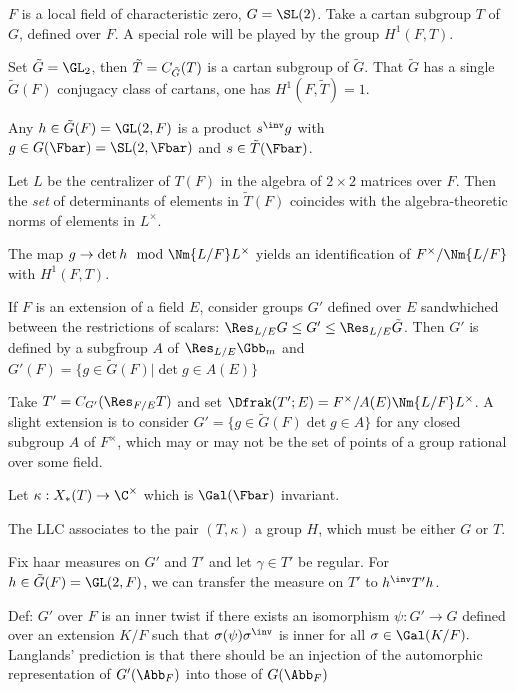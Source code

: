 



$F$ is a local field of characteristic zero, $G=\SL(2)$. Take a cartan subgroup $T$ of $G$, defined over $F$.  A special role will be played by the group $H^1(F,T)$. 

Set $\tilde{G}=\GL_2$, then $\Tilde{T} = C_{\tilde{G}} (T)$ is a cartan subgroup of $\tilde{G}$. That $\tilde{G}$ has a single $\tilde{G}(F)$ conjugacy class of cartans, one has $H^1(F,\tilde{T}) = 1.$  

Any $h\in \tilde{G}(F)=\GL(2,F)$ is a product $s^\inv g$ with $g\in G(\Fbar)=\SL(2,\Fbar)$ and $s \in \tilde{T}(\Fbar)$.

Let $L$ be the centralizer of $T(F)$ in the algebra of $2\times 2$ matrices over $F$. Then the \emph{set} of determinants of elements in $\tilde{T}(F)$ coincides with the algebra-theoretic norms of elements in $L^\times$.

The map $g \to \det h \mod \Nm{L/F} L^\times$ yields an identification of $F^\times / \Nm{L/F}$ with $H^1(F,T)$. 

If $F$ is an extension of a field $E$, consider groups $G'$ defined over $E$ sandwhiched between the restrictions of scalars: $\Res_{L/E}G \leq G' \leq \Res_{L/E}\tilde{G}$. Then $G'$ is defined by a subgfroup $A$ of $\Res_{L/E} \Gbb_m$ and $G'(F) = \{ g \in \tilde{G}(F) \vert \det g \in A (E)\}$

Take $T' = C_{G'}(\Res_{F/E}T)$ and set $\Dfrak(T';E) = F^\times / A(E)\Nm{L/F}L^\times $. A slight extension is to consider $G' = \{ g \in \tilde{G} (F) \det g \in A\}$ for any closed subgroup $A$ of $F^\times$, which may or may not be the set of points of a group rational over some field. 

Let $\kappa : X_* (T) \to \C^\times $ which is $\Gal(\Fbar)$ invariant. 

The LLC associates to the pair $(T,\kappa)$ a group $H$, which must be either $G$ or $T$. 

Fix haar measures on $G'$ and $T'$ and let $\gamma \in T'$ be regular. For $ h \in \tilde{G}(F)=\GL (2,F) $, we can transfer the measure on $T'$ to $h^\inv T' h $. 

Def: $G'$ over $F$ is an inner twist if there exists an isomorphism $\psi: G' \to G$ defined over an extension $K/F$ such that $\sigma(\psi) \sigma ^\inv$ is inner for all $\sigma \in \Gal(K/F).$ Langlands' prediction is that there should be an injection of the automorphic representation of $G'(\Abb_F)$ into those of $G(\Abb_F)$


